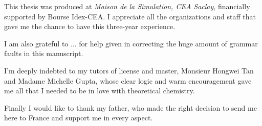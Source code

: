 This thesis was produced at \textit{Maison de la Simulation, CEA Saclay},
financially supported by Bourse Idex-CEA. I appreciate all the
organizations and staff that gave me the chance to have this three-year
experience.

I am also grateful to ... for help given in correcting the huge amount of
grammar faults in this manuscript.

I'm deeply indebted to my tutors of license and master, Monsieur Hongwei
Tan and Madame Michelle Gupta, whose clear logic and warm encouragement
gave me all that I needed to be in love with theoretical chemistry.

Finally I would like to thank my father, who made the right decision
to send me here to France and support me in every aspect.

\endgroup
